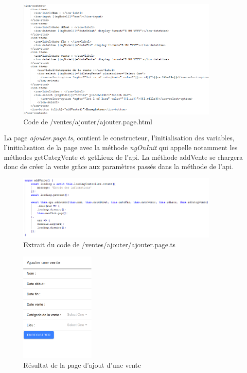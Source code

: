 			\begin{figure}[H]
				\centering\includegraphics[width=0.9\textwidth, keepaspectratio]{res/ajouter.png}
				\caption{Code de /ventes/ajouter/ajouter.page.html}
			\end{figure}

			La page \textit{ajouter.page.ts}, contient le constructeur, l'initialisation des variables, l'initialisation de la page avec la méthode \textit{ngOnInit} qui appelle notamment les méthodes getCategVente et getLieux de l'api.\newline
			La méthode addVente se chargera donc de créer la vente grâce aux paramètres passés dans la méthode de l'api.

			\begin{figure}[H]
				\centering\includegraphics[width=0.9\textwidth, keepaspectratio]{res/ajouterTs.png}
				\caption{Extrait du code de /ventes/ajouter/ajouter.page.ts}
			\end{figure}

			\begin{figure}[H]
				\centering\includegraphics[width=0.33\textwidth, keepaspectratio]{res/ajouterVente.png}
				\caption{Résultat de la page d'ajout d'une vente}
			\end{figure}

